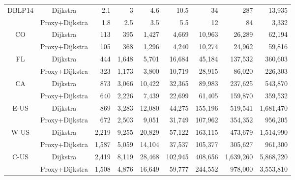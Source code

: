 \begin{table}[t!]
\begin{center}
\begin{tabular}{|c|c||r|r|r|r|r|r|r|}
 \multirow{2}{*}{DBLP14} & Dijkstra & 2.1          & 3   & 4.6 & 10.5 & 34 & 287 & 13,935 \\ \cline{2-9}
                       & Proxy+Dijkstra & {1.8} & {2.5} & {3.5} & {5.5} & {12} & {84} & {3,332} \\ \hline
 \multirow{2}{*}{CO}     & Dijkstra & 113 & 395 & 1,427 & 4,669 & 10,963 & 26,289 & 62,194 \\ \cline{2-9}
                       & Proxy+Dijkstra & {105} & {368} & {1,296} & {4,240} & {10,274} & {24,962} & {59,816} \\ \hline
 \multirow{2}{*}{FL}     & Dijkstra & 444 & 1,648 & 5,701 & 16,684 & 45,184 & 137,532 & 360,603 \\ \cline{2-9}
                       & Proxy+Dijkstra & {323} & {1,173} & {3,800} & {10,719} & {28,915} & {86,020}  & {226,303} \\ \hline
 \multirow{2}{*}{CA}     & Dijkstra & 873 & 3,066 & 10,422 & 32,365 & 89,983 & 237,625 & 543,870 \\ \cline{2-9}
                       & Proxy+Dijkstra & {640} & {2,226} & {7,439}  & {22,699} & {61,405} & {159,870} & {359,532} \\ \hline
 \multirow{2}{*}{E-US}   & Dijkstra & 869 & 3,283 & 12,080 & 44,275 & 155,196 & 519,541 & 1,681,470 \\ \cline{2-9}
                       & Proxy+Dijkstra & {672} & {2,503} & {9,051}  & {31,749} & {107,962} & {354,352} & {956,205} \\ \hline
 \multirow{2}{*}{W-US}   & Dijkstra & 2,219 & 9,255 & 20,829 & 57,122 & 163,115 & 473,679 & 1,514,990 \\ \cline{2-9}
                       & Proxy+Dijkstra & {1,587} & {5,059} & {14,104} & {37,537} & {105,377} & {305,627} & {961,300} \\ \hline
 \multirow{2}{*}{C-US}   & Dijkstra & 2,419 & 8,119 & 28,468 & 102,945 & 408,656 & 1,639,260 & 5,868,220 \\ \cline{2-9}
                       & Proxy+Dijkstra & {1,508} & {4,876} & {16,649} & {59,777} & {244,552} & {978,000} & {3,553,810} \\ \hline
\end{tabular}
\end{center}
\end{table}

